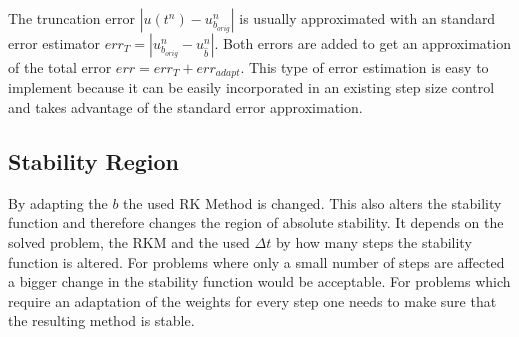\documentclass[a4paper]{scrartcl}
\numberwithin{equation}{section}
\theoremstyle{plain}
\theoremstyle{definition}
\numberwithin{theorem}{section}
\newcommand{\dt}{{\Delta t}}
\newcommand{\1}{\mathbbm{1}}
\begin{document}
The truncation error $|u(t^n)-u^n_{b_{orig}}|$ is usually approximated with an standard error estimator $err_T = | u^{n}_{b_{orig}} - u^{n}_{\hat{b}} |$.
Both errors are added to get an approximation of the total error $err = err_T + err_{adapt}$. %
This type of error estimation is easy to implement because it can be easily incorporated in an existing step size control and takes advantage of the standard error approximation.


\subsection{Stability Region}

By adapting the $b$ the used RK Method is changed. This also alters the stability function and therefore changes the region of absolute stability. 
It depends on the solved problem, the RKM and the used $\dt$ by how many steps the stability function is altered. For problems where only a small number of steps are affected a bigger change in the stability function would be acceptable. For problems which require an adaptation of the weights for every step one needs to make sure that the resulting method is stable.
\end{document}
